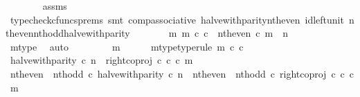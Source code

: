 \begin{isabellebody}
\ \ \ \ \ \ \isamarkupfalse%
\ assms\ \isamarkupfalse%
\ {\isacharparenleft}{\kern0pt}typecheck{\isacharunderscore}{\kern0pt}cfuncs{\isacharunderscore}{\kern0pt}prems{\isacharcomma}{\kern0pt}\ smt\ comp{\isacharunderscore}{\kern0pt}associative{}\ halve{\isacharunderscore}{\kern0pt}with{\isacharunderscore}{\kern0pt}parity{\isacharunderscore}{\kern0pt}nth{\isacharunderscore}{\kern0pt}even\ id{\isacharunderscore}{\kern0pt}left{\isacharunderscore}{\kern0pt}unit{}\ nth{\isacharunderscore}{\kern0pt}even{\isacharunderscore}{\kern0pt}nth{\isacharunderscore}{\kern0pt}odd{\isacharunderscore}{\kern0pt}halve{\isacharunderscore}{\kern0pt}with{\isacharunderscore}{\kern0pt}parity{\isacharparenright}{\kern0pt}\isanewline
\ \ \ \ \isamarkupfalse%
\ \isamarkupfalse%
\ {\isachardoublequoteopen}{\isasymexists}m{\isachardot}{\kern0pt}\ m\ {\isasymin}\isactrlsub c\ {\isasymnat}\isactrlsub c\ {\isasymand}\ nth{\isacharunderscore}{\kern0pt}even\ {\isasymcirc}\isactrlsub c\ m\ {\isacharequal}{\kern0pt}\ n{\isachardoublequoteclose}\isanewline
\ \ \ \ \ \ \isamarkupfalse%
\ m{\isacharunderscore}{\kern0pt}type\ \isamarkupfalse%
\ auto\isanewline
\ \ \isamarkupfalse%
\isanewline
\ \ \ \ \isamarkupfalse%
\ m\isanewline
\ \ \ \ \isamarkupfalse%
\ m{\isacharunderscore}{\kern0pt}type{\isacharbrackleft}{\kern0pt}type{\isacharunderscore}{\kern0pt}rule{\isacharbrackright}{\kern0pt}{\isacharcolon}{\kern0pt}\ {\isachardoublequoteopen}m\ {\isasymin}\isactrlsub c\ {\isasymnat}\isactrlsub c{\isachardoublequoteclose}\isanewline
\ \ \ \ \isamarkupfalse%
\ {\isachardoublequoteopen}halve{\isacharunderscore}{\kern0pt}with{\isacharunderscore}{\kern0pt}parity\ {\isasymcirc}\isactrlsub c\ n\ {\isacharequal}{\kern0pt}\ right{\isacharunderscore}{\kern0pt}coproj\ {\isasymnat}\isactrlsub c\ {\isasymnat}\isactrlsub c\ {\isasymcirc}\isactrlsub c\ m{\isachardoublequoteclose}\isanewline
\ \ \ \ \isamarkupfalse%
\ \isamarkupfalse%
\ {\isachardoublequoteopen}{\isacharparenleft}{\kern0pt}{\isacharparenleft}{\kern0pt}nth{\isacharunderscore}{\kern0pt}even\ {\isasymamalg}\ nth{\isacharunderscore}{\kern0pt}odd{\isacharparenright}{\kern0pt}\ {\isasymcirc}\isactrlsub c\ halve{\isacharunderscore}{\kern0pt}with{\isacharunderscore}{\kern0pt}parity{\isacharparenright}{\kern0pt}\ {\isasymcirc}\isactrlsub c\ n\ {\isacharequal}{\kern0pt}\ {\isacharparenleft}{\kern0pt}{\isacharparenleft}{\kern0pt}nth{\isacharunderscore}{\kern0pt}even\ {\isasymamalg}\ nth{\isacharunderscore}{\kern0pt}odd{\isacharparenright}{\kern0pt}\ {\isasymcirc}\isactrlsub c\ right{\isacharunderscore}{\kern0pt}coproj\ {\isasymnat}\isactrlsub c\ {\isasymnat}\isactrlsub c{\isacharparenright}{\kern0pt}\ {\isasymcirc}\isactrlsub c\ m{\isachardoublequoteclose}\isanewline

\end{isabellebody}
